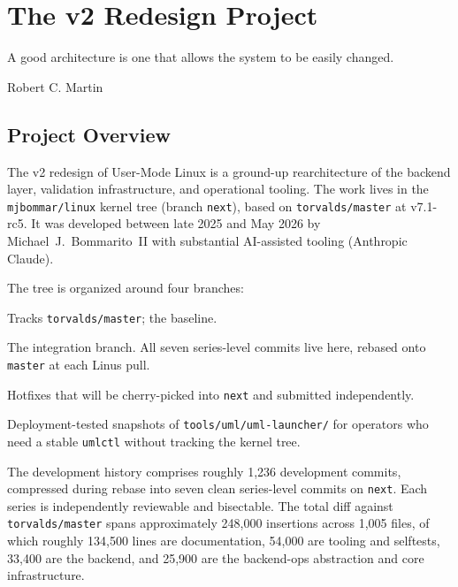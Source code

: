 \chapter{The v2 Redesign Project}
\label{ch:v2redesign}

\epigraph{%
  A good architecture is one that allows the system to be easily changed.%
}{Robert C. Martin}

\section{Project Overview}
\label{sec:v2-overview}

The v2 redesign of User-Mode Linux is a ground-up rearchitecture of
the \UML{} backend layer, validation infrastructure, and operational
tooling.  The work lives in the \texttt{mjbommar/linux} kernel tree
(branch \texttt{next}), based on \texttt{torvalds/master} at
v7.1-rc5.  It was developed between late 2025 and May 2026 by
Michael~J.~Bommarito~II with substantial AI-assisted tooling
(Anthropic Claude).

The tree is organized around four branches:

\begin{description}[style=nextline,leftmargin=2em]
  \item[\texttt{master}]
    Tracks \texttt{torvalds/master}; the baseline.
  \item[\texttt{next}]
    The integration branch.  All seven series-level commits live here,
    rebased onto \texttt{master} at each Linus pull.
  \item[\texttt{fixes}]
    Hotfixes that will be cherry-picked into \texttt{next} and submitted
    independently.
  \item[\texttt{umlctl-deploy}]
    Deployment-tested snapshots of \texttt{tools/uml/uml-launcher/}
    for operators who need a stable \texttt{umlctl} without tracking
    the kernel tree.
\end{description}

\noindent
The development history comprises roughly 1,236 development commits,
compressed during rebase into seven clean series-level commits on
\texttt{next}.  Each series is independently reviewable and
bisectable.  The total diff against \texttt{torvalds/master} spans
approximately 248,000 insertions across 1,005 files, of which roughly
134,500 lines are documentation, 54,000 are tooling and selftests,
33,400 are the \KVMvTwo{} backend, and 25,900 are the backend-ops
abstraction and core infrastructure.


